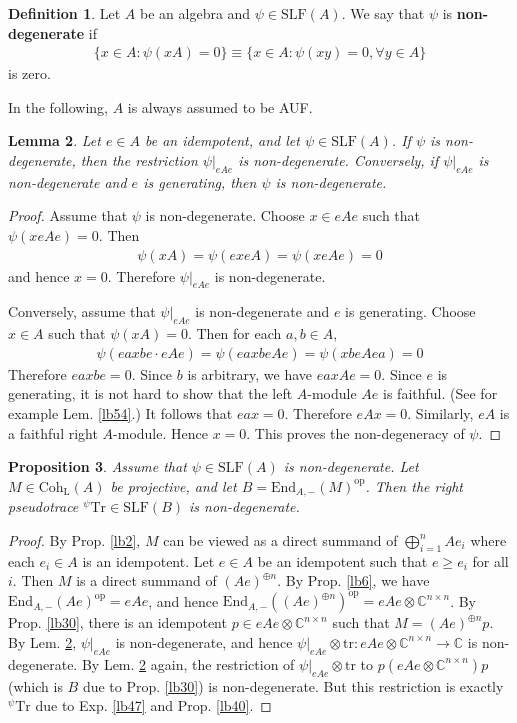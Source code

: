 \documentclass[11pt,b5paper,notitlepage]{article}
\theoremstyle{definition}
\newtheorem{df}{Definition}[section]
\theoremstyle{plain}
\newtheorem{pp}[df]{Proposition}
\newtheorem{lm}[df]{Lemma}
\newcommand{\Tr}{\mathrm{Tr}}
\newcommand{\End}{\mathrm{End}} %
\newcommand{\opp}{\mathrm{op}}
\newcommand{\Cbb}{\mathbb C}
\newcommand{\Coh}{\mathrm{Coh}_{\mathrm L}}
\newcommand{\SLF}{\mathrm{SLF}}
\newcommand{\trc}{\mathrm{tr}}
\numberwithin{equation}{section}
\begin{document}
\begin{df}
Let $A$ be an algebra and $\psi\in\SLF(A)$. We say that $\psi$ is \textbf{non-degenerate} if
\begin{align*}
\{x\in A:\psi(xA)=0\}\equiv\{x\in A:\psi(xy)=0,\forall y\in A\}
\end{align*}
is zero.
\end{df}


In the following, $A$ is always assumed to be AUF.


\begin{lm}\label{lb60}
Let $e\in A$ be an idempotent, and let $\psi\in\SLF(A)$. If $\psi$ is non-degenerate, then the restriction $\psi|_{eAe}$ is non-degenerate. Conversely, if $\psi|_{eAe}$ is non-degenerate and $e$ is generating, then $\psi$ is non-degenerate.
\end{lm}

\begin{proof}
Assume that $\psi$ is non-degenerate. Choose $x\in eAe$ such that $\psi(xeAe)=0$. Then
\begin{align*}
\psi(xA)=\psi(exeA)=\psi(xeAe)=0
\end{align*}
and hence $x=0$. Therefore $\psi|_{eAe}$ is non-degenerate.

Conversely, assume that $\psi|_{eAe}$ is non-degenerate and $e$ is generating. Choose $x\in A$ such that $\psi(xA)=0$. Then for each $a,b\in A$,
\begin{align*}
\psi(eaxbe\cdot eAe)=\psi(eaxbeAe)=\psi(xbeAea)=0
\end{align*}
Therefore $eaxbe=0$. Since $b$ is arbitrary, we have  $eaxAe=0$. Since $e$ is generating, it is not hard to show that the left $A$-module $Ae$ is faithful. (See for example Lem. \ref{lb54}.) It follows that $eax=0$. Therefore $eAx=0$. Similarly, $eA$ is a faithful right $A$-module. Hence $x=0$. This proves the non-degeneracy of $\psi$.
\end{proof}


\begin{pp}
Assume that $\psi\in\SLF(A)$ is non-degenerate. Let $M\in\Coh(A)$ be projective, and let $B=\End_{A,-}(M)^\opp$.  Then the right pseudotrace ${}^\psi\Tr\in\SLF(B)$ is non-degenerate.
\end{pp}


\begin{proof}
By Prop. \ref{lb2}, $M$ can be viewed as a direct summand of $\bigoplus_{i=1}^n Ae_i$ where each $e_i\in A$ is an idempotent. Let $e\in A$ be an idempotent such that $e\geq e_i$ for all $i$. Then $M$ is a direct summand of $(Ae)^{\oplus n}$. By Prop. \ref{lb6}, we have $\End_{A,-}(Ae)^\opp=eAe$, and hence $\End_{A,-}((Ae)^{\oplus n})^\opp= eAe\otimes\Cbb^{n\times n}$. By Prop. \ref{lb30}, there is an idempotent $p\in eAe\otimes\Cbb^{n\times n}$ such that $M=(Ae)^{\oplus n}p$. By Lem. \ref{lb60}, $\psi|_{eAe}$ is non-degenerate, and hence $\psi|_{eAe}\otimes\trc:eAe\otimes\Cbb^{n\times n}\rightarrow\Cbb$ is non-degenerate. By Lem. \ref{lb60} again, the restriction of $\psi|_{eAe}\otimes\trc$ to $p(eAe\otimes\Cbb^{n\times n})p$ (which is $B$ due to Prop. \ref{lb30}) is non-degenerate. But this restriction is exactly ${}^\psi\Tr$ due to Exp. \ref{lb47} and Prop. \ref{lb40}.
\end{proof}
\end{document}
